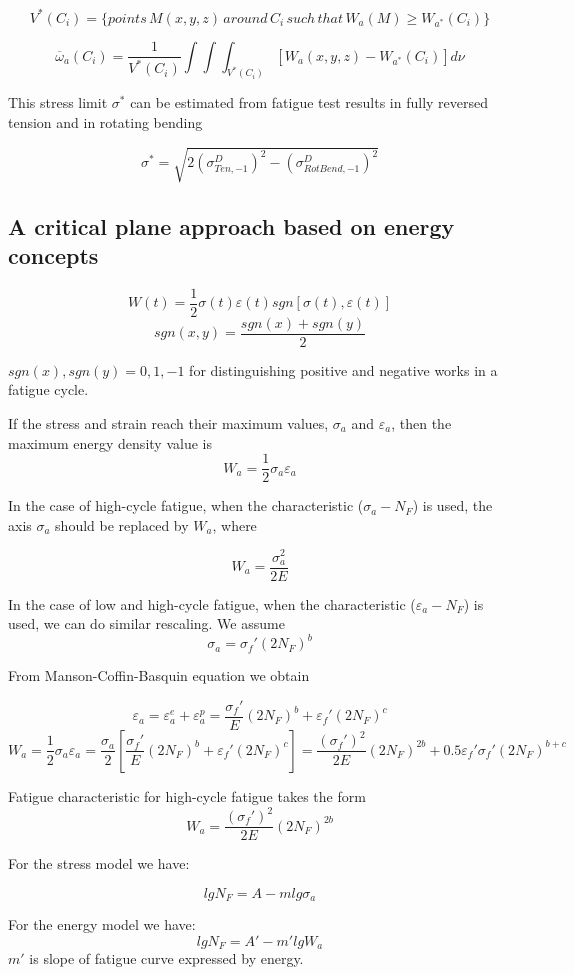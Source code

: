 \documentclass[3p,times,procedia,number]{elsarticle}
\begin{document}
$$V^*(C_i)=\lbrace points\, M(x,y,z) \,around\, C_i \,such\, that \,W_a(M)\geqslant W_{a^*}(C_i) \rbrace$$

$$\overline{\omega}_a(C_i)=\frac{1}{V^*(C_i)}\int\int\int_{V^*(C_i)}^{}[W_a(x,y,z)-W_{a^*}(C_i)]d\nu$$

This stress limit $\sigma^*$ can be estimated from
fatigue test results in fully reversed tension and in rotating
bending

$$\sigma^*=\sqrt{2(\sigma_{Ten,-1}^D)^2-(\sigma_{RotBend,-1}^D)^2}$$


\subsection{A critical plane approach based on energy concepts}
$$W(t)=\frac{1}{2}\sigma(t)\varepsilon(t)sgn[\sigma(t),\varepsilon(t)]$$
$$sgn(x,y)=\frac{sgn(x)+sgn(y)}{2}$$

$sgn(x),sgn(y)=0,1,-1$ for distinguishing positive and negative works in a
fatigue cycle\cite{lagoda1999critical}.

If the stress and strain reach their maximum values,
$\sigma_a$ and $\varepsilon_a$, then the maximum energy density value is
$$W_a=\frac{1}{2}\sigma_a\varepsilon_a$$

In the case of high-cycle fatigue,
when the characteristic ($\sigma_a-N_F$) is used, the axis $\sigma_a$
should be replaced by $W_a$, where

$$W_a=\frac{\sigma_a^2}{2E}$$

In the case of low and high-cycle fatigue, when the
characteristic ($\varepsilon_a-N_F$) is used, we can do similar rescaling. We assume $$\sigma_a=\sigma_f'(2N_F)^b$$

From Manson-Coffin-Basquin equation we obtain

$$\varepsilon_a=\varepsilon_a^e+\varepsilon_a^p=\frac{\sigma_f'}{E}(2N_F)^b+\varepsilon_f'(2N_F)^c$$
$$W_a=\frac{1}{2}\sigma_a\varepsilon_a=\frac{\sigma_a}{2}\left[\frac{\sigma_f'}{E}(2N_F)^b+\varepsilon_f'(2N_F)^c\right]=\frac{(\sigma_f')^2}{2E}(2N_F)^{2b}+0.5\varepsilon_f'\sigma_f'(2N_F)^{b+c}$$

Fatigue characteristic for high-cycle fatigue
takes the form
$$W_a=\frac{(\sigma_f')^2}{2E}(2N_F)^{2b}$$

For the stress model we have:

$$lgN_F=A-mlg\sigma_a$$

For the energy model we have:
$$lgN_F=A'-m'lgW_a$$
$m'$ is slope of fatigue curve
expressed by energy.
\end{document}

